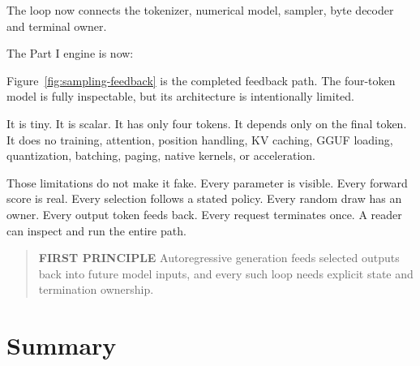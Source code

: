 The loop now connects the tokenizer, numerical model, sampler, byte decoder and terminal owner.

The Part I engine is now:

Figure~\ref{fig:sampling-feedback} is the completed feedback path. The four-token model is fully inspectable, but its architecture is intentionally limited.

It is tiny. It is scalar. It has only four tokens. It depends only on
the final token. It does no training, attention, position handling, KV
caching, GGUF loading, quantization, batching, paging, native kernels,
or acceleration.

Those limitations do not make it fake. Every parameter is visible. Every
forward score is real. Every selection follows a stated policy. Every
random draw has an owner. Every output token feeds back. Every request
terminates once. A reader can inspect and run the entire path.

\begin{quote}
\textbf{FIRST PRINCIPLE} Autoregressive generation feeds selected
outputs back into future model inputs, and every such loop needs
explicit state and termination ownership.
\end{quote}

\section{Summary}\label{summary-3}

